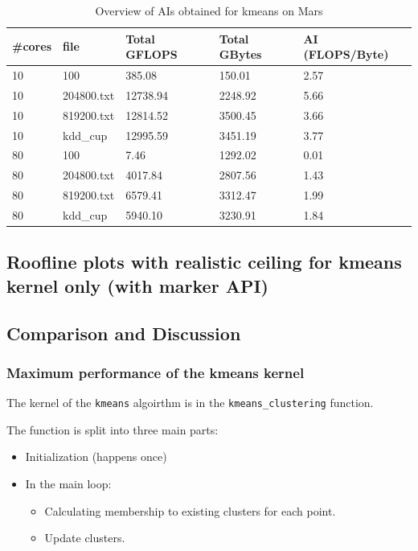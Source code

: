 \begin{table}[h]
\centering
\caption{\label{tab:ai_tab}Overview of AIs obtained for kmeans on Mars}
\begin{small}
\begin{tabular}{lllll}
\toprule
\#cores & file & Total GFLOPS & Total GBytes & AI (FLOPS/Byte) \\
\midrule
10 & 100 & 385.08 & 150.01 & 2.57 \\
10 & 204800.txt & 12738.94 & 2248.92 & 5.66 \\
10 & 819200.txt & 12814.52 & 3500.45 & 3.66 \\
10 & kdd\_cup & 12995.59 & 3451.19 & 3.77 \\
80 & 100 & 7.46 & 1292.02 & 0.01 \\
80 & 204800.txt & 4017.84 & 2807.56 & 1.43 \\
80 & 819200.txt & 6579.41 & 3312.47 & 1.99 \\
80 & kdd\_cup & 5940.10 & 3230.91 & 1.84 \\

\bottomrule
\end{tabular}
\end{small}
\end{table}

\subsection{Roofline plots with realistic ceiling for kmeans kernel only (with marker API)}

\subsection{Comparison and Discussion}


\subsubsection{Maximum performance of the kmeans kernel}

The kernel of the \texttt{kmeans} algoirthm is in the \texttt{kmeans\_clustering} function.

The function is split into three main parts:
\begin{itemize}
	\item Initialization (happens once)
	\item In the main loop:
	\begin{itemize}
		\item Calculating membership to existing clusters for each point.
		\item Update clusters.
	\end{itemize}
\end{itemize}

